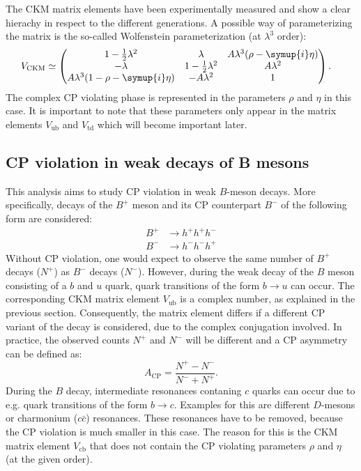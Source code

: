 The CKM matrix elements have been experimentally measured and show a clear hierachy in respect to the different generations. A possible way of parameterizing the matrix
is the so-called Wolfenstein parameterization (at $\lambda^3$ order):
\begin{align*}
    V_{\text{CKM}} & \simeq
    \begin{pmatrix}
        1-\frac{1}{2}\lambda^2 & \lambda & A\lambda^3(\rho-\symup{i}\eta) \\
        -\lambda & 1-\frac{1}{2}\lambda^2 & A\lambda^2 \\
        A\lambda^3(1-\rho-\symup{i}\eta) & -A\lambda^2 & 1 \\
    \end{pmatrix}.
\end{align*}
The complex CP violating phase is represented in the parameters $\rho$ and $\eta$ in this case. It is important to note that these parameters only appear in the matrix elements
$V_{\text{ub}}$ and $V_{\text{td}}$ which will become important later.

\subsection{CP violation in weak decays of B mesons}

This analysis aims to study CP violation in weak $B$-meson decays. More specifically, decays of the $B^+$ meson and its CP counterpart $B^-$ of the following form
are considered:
\begin{align*}
    B^+ &\rightarrow h^+ h^+ h^- \\
    B^- &\rightarrow h^- h^- h^+
\end{align*}
Without CP violation, one would expect to observe the same number of $B^+$ decays ($N^+$) as $B^-$ decays ($N^-$). However, during the weak decay of the
$B$ meson consisting of a $b$ and $u$ quark, quark transitions of the form $b \rightarrow u$ can occur. The corresponding CKM matrix element $V_{\text{ub}}$
is a complex number, as explained in the previous section. Consequently, the matrix element differs if a different CP variant of the decay is considered, due
to the complex conjugation involved. In practice, the observed counts $N^+$ and $N^-$ will be different and a CP asymmetry can be defined \cite{LHCbCPV} as:
\begin{equation*}
    A_{\text{CP}} = \frac{N^+ - N^-}{N^- + N^+}.
\end{equation*}
During the $B$ decay, intermediate resonances contaning $c$ quarks can occur due to e.g. quark transitions of the form $b \rightarrow c$. Examples for this are
different $D$-mesons or charmonium ($c \bar{c}$) resonances. These resonances have to be removed, because the CP violation is much smaller in this case. The reason for this is
the CKM matrix element $V_{\text{cb}}$ that does not contain the CP violating parameters $\rho$ and $\eta$ (at the given order).